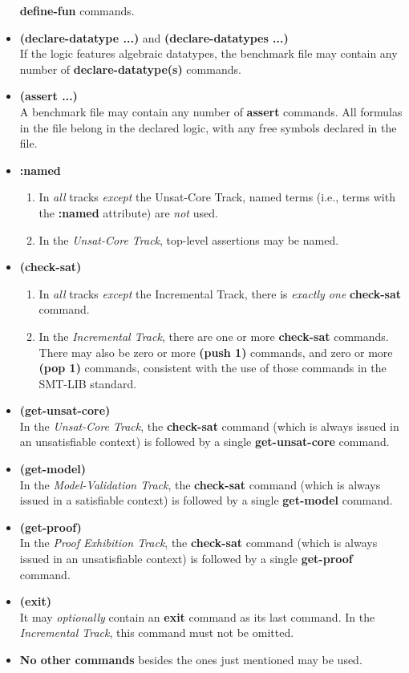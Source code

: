 \documentclass[12pt]{article}
\newcommand{\akey}[1]{\textbf{#1}\xspace}
\newcommand{\bkey}[1]{\textbf{{#1}}\xspace}
\newcommand{\inctrack}{Incremental Track\xspace}
\newcommand{\ucoretrack}{Unsat-Core Track\xspace}
\newcommand{\mvaltrack}{Model-Validation Track\xspace}
\newcommand{\prooftrack}{Proof Exhibition Track\xspace}
\begin{document}
\begin{itemize}
    \akey{define-fun} commands.
  \item \bkey{(declare-datatype ...)} and \bkey{(declare-datatypes ...)}\\
    If the logic features algebraic datatypes, the benchmark file may
    contain any number of \akey{declare-datatype(s)} commands.
  \item \bkey{(assert ...)}\\
    A benchmark file may contain any number of \akey{assert} commands.  All
    formulas in the file belong in the declared logic, with any free symbols
    declared in the file.
  \item
    \bkey{:named}
    \begin{enumerate}[label=(\alph*)]
      \vspace{-1ex}
      \item In \emph{all} tracks \emph{except} the \ucoretrack,  named
        terms (i.e., terms with the \akey{:named} attribute) are \emph{not}
        used.
      \item In the \emph{\ucoretrack}, top-level assertions may be named.
    \end{enumerate}
  \item
    \bkey{(check-sat)}
    \begin{enumerate}[label=(\alph*)]
      \vspace{-1ex}
    \item In \emph{all} tracks \emph{except} the \inctrack, there is
      \emph{exactly one} \akey{check-sat} command.
    \item In the \emph{\inctrack}, there are one or more
      \akey{check-sat} commands.  There may also be zero or more
      \akey{(push 1)} commands, and zero or more \akey{(pop 1)} commands,
      consistent with the use of those commands in the SMT-LIB standard.
    \end{enumerate}
  \item \bkey{(get-unsat-core)}\\
    In the \emph{\ucoretrack}, the \akey{check-sat} command (which is
    always issued in an unsatisfiable context) is followed by a single
    \akey{get-unsat-core} command.
  \item \bkey{(get-model)}\\
    In the \emph{\mvaltrack}, the \akey{check-sat} command (which is
    always issued in a satisfiable context) is followed by a single
    \akey{get-model} command.
  \item \bkey{(get-proof)}\\
    In the \emph{\prooftrack}, the \akey{check-sat} command (which is
    always issued in an unsatisfiable context) is followed by a single
    \akey{get-proof} command.
  \item \bkey{(exit)}\\
    It may \emph{optionally} contain an \akey{exit} command as its
    last command.  In the \emph{\inctrack}, this command must not be
    omitted.
  \item \textbf{No other commands} besides the ones just mentioned may be used.
\end{itemize}
\end{document}
